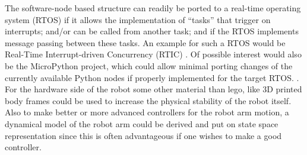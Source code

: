 The software-node based structure can readily be ported to a real-time
operating system (RTOS) if it allows the implementation of ``tasks''
that trigger on interrupts; and/or can be called from another task; and
if the RTOS implements message passing between these tasks. An example
for such a RTOS would be Real-Time Interrupt-driven Concurrency (RTIC)
\parencite{rtic}. Of possible interest would also be the MicroPython
project, which could allow minimal porting changes of the currently
available Python nodes if properly implemented for the target RTOS.
\parencite{micropython}.\newpage
For the hardware side of the robot some other material than lego, like 3D printed body frames could be used to increase the physical stability of the robot itself. Also to make better or more advanced controllers for the robot arm motion, a dynamical model of the robot arm could be derived and put on state space representation since this is often advantageous if one wishes to make a good controller.
